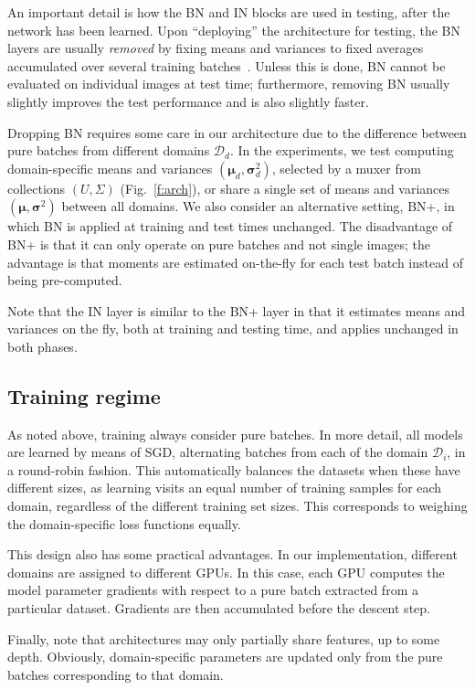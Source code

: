 \documentclass[10pt,twocolumn,letterpaper]{article}
\begin{document}
An important detail is how the BN and IN blocks are used in testing, after the network has been learned. Upon ``deploying'' the architecture for testing, the BN layers are usually \emph{removed} by fixing means and variances to fixed averages accumulated over several training batches~\cite{ioffe15batch}. Unless this is done, BN cannot be evaluated on individual images at test time; furthermore, removing BN usually slightly improves the test performance and is also slightly faster.

Dropping BN requires some care in our architecture due to the difference between pure batches from different domains $\mathcal{D}_d$. In the experiments, we test computing domain-specific means and variances $(\bm\mu_d,\bm\sigma_d^2)$, selected by a muxer from collections $(U,\Sigma)$ (Fig.~\ref{f:arch}), or share a single set of means and variances $(\bm\mu,\bm\sigma^2)$ between all domains. We also consider an alternative setting, BN+, in which BN is applied at training and test times unchanged. The disadvantage of BN+ is that it can only operate on pure batches and not single images; the advantage is that moments are estimated on-the-fly for each test batch instead of being pre-computed.

Note that the IN layer is similar to the BN+ layer in that it estimates means and variances on the fly, both at training and testing time, and applies unchanged in both phases.

\subsection{Training regime}\label{s:regime}


As noted above, training always consider pure batches. In more detail, all models are learned by means of SGD, alternating batches from each of the domain $\mathcal{D}_i$, in a round-robin fashion. This automatically balances the datasets when these have different sizes, as learning visits an equal number of training samples for each domain, regardless of the different training set sizes. This corresponds to weighing the domain-specific loss functions equally.

This design also has some practical advantages. In our implementation, different domains are assigned to different GPUs. In this case, each GPU computes the model parameter gradients with respect to a pure batch extracted from a particular dataset. Gradients are then accumulated before the descent step.

Finally, note that architectures may only partially share features, up to some depth. Obviously, domain-specific parameters are updated only from the pure batches corresponding to that domain.
\end{document}
